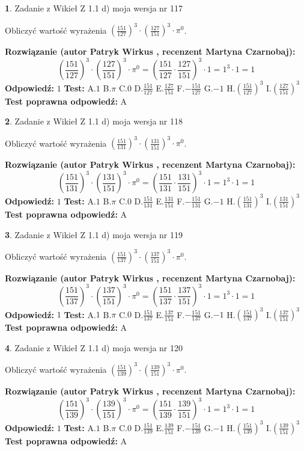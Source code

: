 \documentclass[12pt, a4paper]{article}
\theoremstyle{definition} %
\newtheorem{zad}{}
\newcommand{\zadStart}[1]{\begin{zad}#1\newline}
\newcommand{\zadStop}{\end{zad}}
\newcommand{\rozwStart}[2]{\noindent \textbf{Rozwiązanie (autor #1 , recenzent #2): }\newline}
\newcommand{\rozwStop}{\newline}
\newcommand{\odpStart}{\noindent \textbf{Odpowiedź:}\newline}
\newcommand{\odpStop}{\newline}
\newcommand{\testStart}{\noindent \textbf{Test:}\newline}
\newcommand{\testStop}{\newline}
\newcommand{\kluczStart}{\noindent \textbf{Test poprawna odpowiedź:}\newline}
\newcommand{\kluczStop}{\newline}
\begin{document}
\zadStart{Zadanie z Wikieł Z 1.1 d) moja wersja nr 117}

Obliczyć wartość wyrażenia $(\frac{151}{127})^{3} \cdot (\frac{127}{151})^{3} \cdot \pi^{0}$.
\zadStop
\rozwStart{Patryk Wirkus}{Martyna Czarnobaj}
$$(\frac{151}{127})^{3} \cdot (\frac{127}{151})^{3} \cdot \pi^{0} = (\frac{151}{127} \cdot \frac{127}{151})^{3} \cdot 1 = 1^{3} \cdot 1 = 1$$
\rozwStop
\odpStart
$1$
\odpStop
\testStart
A.$1$ B.$\pi$ C.$0$ D.$\frac{151}{127}$ E.$\frac{127}{151}$
F.$-\frac{151}{127}$ G.$-1$
H.$(\frac{151}{127})^{3}$
I.$(\frac{127}{151})^{3}$
\testStop
\kluczStart
A
\kluczStop



\zadStart{Zadanie z Wikieł Z 1.1 d) moja wersja nr 118}

Obliczyć wartość wyrażenia $(\frac{151}{131})^{3} \cdot (\frac{131}{151})^{3} \cdot \pi^{0}$.
\zadStop
\rozwStart{Patryk Wirkus}{Martyna Czarnobaj}
$$(\frac{151}{131})^{3} \cdot (\frac{131}{151})^{3} \cdot \pi^{0} = (\frac{151}{131} \cdot \frac{131}{151})^{3} \cdot 1 = 1^{3} \cdot 1 = 1$$
\rozwStop
\odpStart
$1$
\odpStop
\testStart
A.$1$ B.$\pi$ C.$0$ D.$\frac{151}{131}$ E.$\frac{131}{151}$
F.$-\frac{151}{131}$ G.$-1$
H.$(\frac{151}{131})^{3}$
I.$(\frac{131}{151})^{3}$
\testStop
\kluczStart
A
\kluczStop



\zadStart{Zadanie z Wikieł Z 1.1 d) moja wersja nr 119}

Obliczyć wartość wyrażenia $(\frac{151}{137})^{3} \cdot (\frac{137}{151})^{3} \cdot \pi^{0}$.
\zadStop
\rozwStart{Patryk Wirkus}{Martyna Czarnobaj}
$$(\frac{151}{137})^{3} \cdot (\frac{137}{151})^{3} \cdot \pi^{0} = (\frac{151}{137} \cdot \frac{137}{151})^{3} \cdot 1 = 1^{3} \cdot 1 = 1$$
\rozwStop
\odpStart
$1$
\odpStop
\testStart
A.$1$ B.$\pi$ C.$0$ D.$\frac{151}{137}$ E.$\frac{137}{151}$
F.$-\frac{151}{137}$ G.$-1$
H.$(\frac{151}{137})^{3}$
I.$(\frac{137}{151})^{3}$
\testStop
\kluczStart
A
\kluczStop



\zadStart{Zadanie z Wikieł Z 1.1 d) moja wersja nr 120}

Obliczyć wartość wyrażenia $(\frac{151}{139})^{3} \cdot (\frac{139}{151})^{3} \cdot \pi^{0}$.
\zadStop
\rozwStart{Patryk Wirkus}{Martyna Czarnobaj}
$$(\frac{151}{139})^{3} \cdot (\frac{139}{151})^{3} \cdot \pi^{0} = (\frac{151}{139} \cdot \frac{139}{151})^{3} \cdot 1 = 1^{3} \cdot 1 = 1$$
\rozwStop
\odpStart
$1$
\odpStop
\testStart
A.$1$ B.$\pi$ C.$0$ D.$\frac{151}{139}$ E.$\frac{139}{151}$
F.$-\frac{151}{139}$ G.$-1$
H.$(\frac{151}{139})^{3}$
I.$(\frac{139}{151})^{3}$
\testStop
\kluczStart
A
\kluczStop
\end{document}
